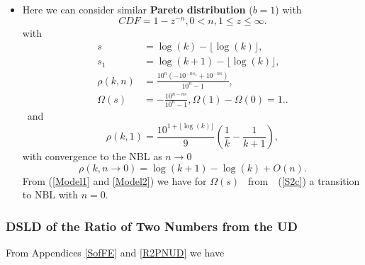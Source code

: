 \documentclass[titlepage,fleqn]{article}%
\begin{document}
\begin{itemize}
\item Here we can consider similar \textbf{Pareto distribution} ($b=1$) with
\[
CDF=1-z^{-n},0<n,1\leq z\leq\infty.
\]
with
\begin{align}
s  &  =\log(k)-\lfloor\log(k)\rfloor,\label{Model2}\\
s_{1}  &  =\log(k+1)-\lfloor\log(k)\rfloor,\nonumber\\
\rho(k,n)  &  =\frac{10^{n}\left(  -10^{-ns_{1}}+10^{-ns}\right)  }{10^{n}%
-1},\nonumber\\
\Omega(s)  &  =-\frac{10^{n-ns}}{10^{n}-1},\Omega(1)-\Omega(0)=1..\nonumber
\end{align}
\ and
\[
\rho(k,1)=\frac{10^{1+\lfloor\log(k)\rfloor}}{9}\left(  \frac{1}{k}-\frac
{1}{k+1}\right)  ,
\]
with convergence to the NBL as $n\rightarrow0$
\[
\rho(k,n\rightarrow0)=\log(k+1)-\log(k)+O(n).
\]
From (\ref{Model1} and \ref{Model2}) we have for $\Omega(s)$%
\ from\ \ (\ref{S2c}) a transition to NBL with $n=0.$
\end{itemize}

\subsubsection{DSLD of the Ratio of Two Numbers from the UD}%

\label{DofDRatio2UD}%


From Appendices
\ref{SofFE}
and
\ref{R2PNUD}
we have%
\end{document}

